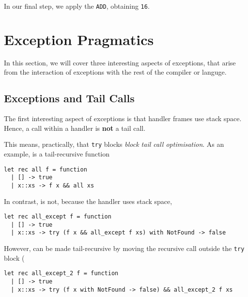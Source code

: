 \begin{center}
\end{center}

In our final step, we apply the \texttt{ADD}, obtaining \texttt{16}.

\section{Exception Pragmatics}
In this section, we will cover three interesting aspects of exceptions, that arise from the interaction of exceptions with the rest of the compiler or languge. 

\subsection{Exceptions and Tail Calls}
The first interesting aspect of exceptions is that handler frames use stack space. Hence, a call within a handler is \textbf{not} a tail call. 

This means, practically, that \texttt{try} blocks \textit{block tail call optimisation}. As an example,  is a tail-recursive function

\begin{code}
    \label{code:all-ocaml}
\begin{verbatim}
let rec all f = function 
  | [] -> true
  | x::xs -> f x && all xs
\end{verbatim}
\end{code}

In contrast,  is not, because the handler uses stack space,

\begin{code}
    \label{code:all-except-ocaml}
\begin{verbatim}
let rec all_except f = function 
  | [] -> true
  | x::xs -> try (f x && all_except f xs) with NotFound -> false
\end{verbatim}
\end{code}

However,  can be made tail-recursive by moving the recursive call outside the \texttt{try} block (

\begin{code}
    \label{code:all-except-2-ocaml}
\begin{verbatim}
let rec all_except_2 f = function 
  | [] -> true
  | x::xs -> try (f x with NotFound -> false) && all_except_2 f xs
\end{verbatim}
\end{code}

